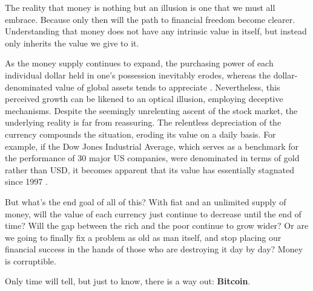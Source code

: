 The reality that money is nothing but an illusion is one that we must all embrace. Because only then will the path to financial freedom become
clearer. Understanding that money does not have any intrinsic value in itself, but instead only inherits the value we give to it.

As the money supply continues to expand, the purchasing power of each individual dollar held in one's possession inevitably erodes, whereas the
dollar-denominated value of global assets tends to appreciate \cite{moneyprinting}. Nevertheless, this perceived growth can be likened to an
optical illusion, employing deceptive mechanisms. Despite the seemingly unrelenting ascent of the stock market, the underlying reality is far
from reassuring. The relentless depreciation of the currency compounds the situation, eroding its value on a daily basis. For example, if the
Dow Jones Industrial Average, which serves as a benchmark for the performance of 30 major US companies, were denominated in terms of gold rather
than USD, it becomes apparent that its value has essentially stagnated since 1997 \cite{stockmarketillusion}.

But what's the end goal of all of this? With fiat and an unlimited supply of money, will the value of each currency just continue to decrease
until the end of time? Will the gap between the rich and the poor continue to grow wider? Or are we going to finally fix a problem as old as
man itself, and stop placing our financial success in the hands of those who are destroying it day by day? Money is corruptible.

Only time will tell, but just to know, there is a way out: \textbf{Bitcoin}.
